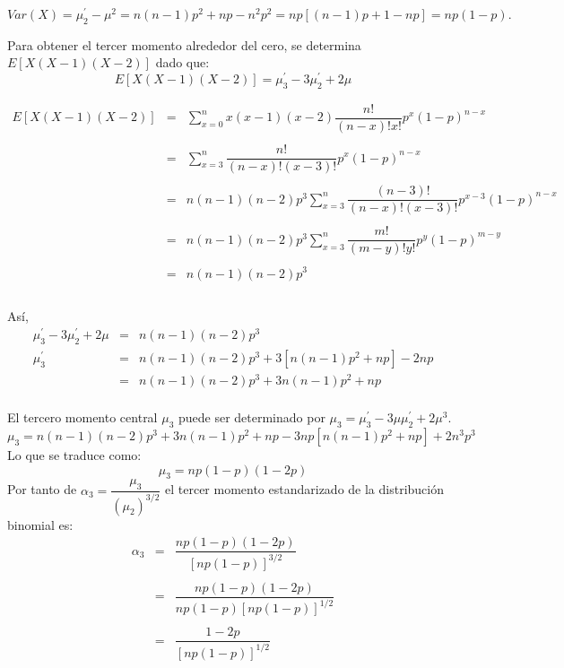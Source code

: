 \begin{tcolorbox}[colback=white]
    $$Var(X) = \mu_2^{'}-\mu^2 = n(n-1)p^2 + np - n^2p^2 = np[(n-1)p+1-np] = np(1-p).$$
\end{tcolorbox}

\vspace{1cm}

Para obtener el tercer momento alrededor del cero, se determina $E[X(X-1)(X-2)]$ dado que:
$$E[X(X-1)(X-2)]=\mu_3^{'} - 3\mu_2^{'} + 2\mu$$

$$\begin{array}{rcl}
    E[X(X-1)(X-2)]&=&\sum\limits_{x=0}^n x(x-1)(x-2)\dfrac{n!}{(n-x)!x!} p^x(1-p)^{n-x}\\\\
		  &=&\sum\limits_{x=3}^n \dfrac{n!}{(n-x)!(x-3)!}p^x(1-p)^{n-x}\\\\
		  &=&n(n-1)(n-2)p^3 \sum_{x=3}^n \dfrac{(n-3)!}{(n-x)!(x-3)!}p^{x-3}(1-p)^{n-x}\\\\
		  &=&n(n-1)(n-2)p^3 \sum_{x=3}^n \dfrac{m!}{(m-y)!y!}p^{y}(1-p)^{m-y}\\\\
		  &=&n(n-1)(n-2)p^3\\\\
\end{array}$$

Así,
$$\begin{array}{rcl}
    \mu_3^{'}-3\mu_2^{'}+2\mu&=&n(n-1)(n-2)p^3\\
    \mu_3^{'}&=&n(n-1)(n-2)p^3+3[n(n-1)p^2+np]-2np\\
	     &=&n(n-1)(n-2)p^3+3n(n-1)p^2+np\\
\end{array}$$

El tercero momento central $\mu_3$ puede ser determinado por $\mu_3 = \mu_3^{'}-3\mu\mu_2^{'} + 2\mu^3$.
$$\mu_3 = n(n-1)(n-2)p^3 +3n(n-1)p^2 + np-3np[n(n-1)p^2+np]+2n^3p^3$$
Lo que se traduce como:
$$\mu_3=np(1-p)(1-2p)$$
Por tanto de $\alpha_3 = \dfrac{\mu_3}{(\mu_2)^{3/2}}$ el tercer momento estandarizado de la distribución binomial es:
$$\begin{array}{rcl}
    \alpha_3&=&\dfrac{np(1-p)(1-2p)}{[np(1-p)]^{3/2}}\\\\
	    &=&\dfrac{np(1-p)(1-2p)}{np(1-p)[np(1-p)]^{1/2}}\\\\
	    &=&\dfrac{1-2p}{[np(1-p)]^{1/2}}\\\\
\end{array}$$


